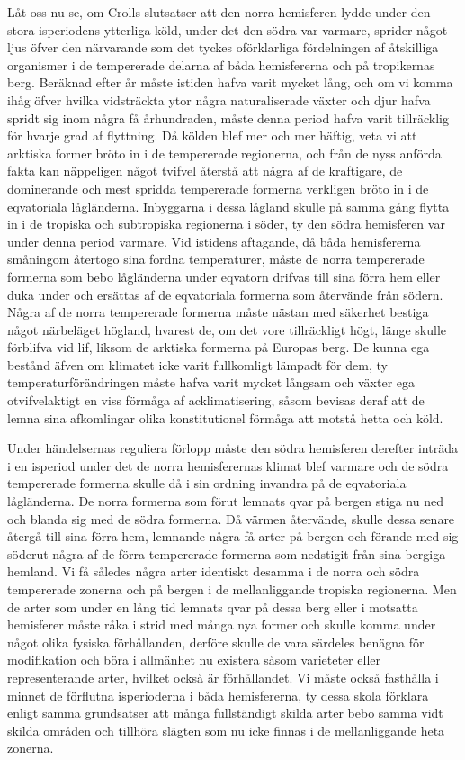 Låt oss nu se, om Crolls slutsatser att den norra hemisferen lydde under den stora isperiodens ytterliga köld, under det den södra var varmare, sprider något ljus öfver den närvarande som det tyckes oförklarliga fördelningen af åtskilliga organismer i de tempererade delarna af båda hemisfererna och på tropikernas berg. Beräknad efter år måste istiden hafva varit mycket lång, och om vi komma ihåg öfver hvilka vidsträckta ytor några naturaliserade växter och djur hafva spridt sig inom några få århundraden, måste denna period hafva varit tillräcklig för hvarje grad af flyttning. Då kölden blef mer och mer häftig, veta vi att arktiska former bröto in i de tempererade regionerna, och från de nyss anförda fakta kan näppeligen något tvifvel återstå att några af de kraftigare, de dominerande och mest spridda tempererade formerna verkligen bröto in i de eqvatoriala lågländerna. Inbyggarna i dessa lågland skulle på samma gång flytta in i de tropiska och subtropiska regionerna i söder, ty den södra hemisferen var under denna period varmare. Vid istidens aftagande, då båda hemisfererna småningom återtogo sina fordna temperaturer, måste de norra tempererade formerna som bebo lågländerna under eqvatorn drifvas till sina förra hem eller duka under och ersättas af de eqvatoriala formerna som återvände från södern. Några af de norra tempererade formerna måste nästan med säkerhet bestiga något närbeläget högland, hvarest de, om det vore tillräckligt högt, länge skulle förblifva vid lif, liksom de arktiska formerna på Europas berg. De kunna ega bestånd äfven om klimatet icke varit fullkomligt lämpadt för dem, ty temperaturförändringen måste hafva varit mycket långsam och växter ega otvifvelaktigt en viss förmåga af acklimatisering, såsom bevisas deraf att de lemna sina afkomlingar olika konstitutionel förmåga att motstå hetta och köld.

Under händelsernas reguliera förlopp måste den södra hemisferen derefter inträda i en isperiod under det de norra hemisferernas klimat blef varmare och de södra tempererade formerna skulle då i sin ordning invandra på de eqvatoriala lågländerna. De norra formerna som förut lemnats qvar på bergen stiga nu ned och blanda sig med de södra formerna. Då värmen återvände, skulle dessa senare återgå till sina förra hem, lemnande några få arter på bergen och förande med sig söderut några af de förra tempererade formerna som nedstigit från sina bergiga hemland. Vi få således några arter identiskt desamma i de norra och södra tempererade zonerna och på bergen i de mellanliggande tropiska regionerna. Men de arter som under en lång tid lemnats qvar på dessa berg eller i motsatta hemisferer måste råka i strid med många nya former och skulle komma under något olika fysiska förhållanden, derföre skulle de vara särdeles benägna för modifikation och böra i allmänhet nu existera såsom varieteter eller representerande arter, hvilket också är förhållandet. Vi måste också fasthålla i minnet de förflutna isperioderna i båda hemisfererna, ty dessa skola förklara enligt samma grundsatser att många fullständigt skilda arter bebo samma vidt skilda områden och tillhöra slägten som nu icke finnas i de mellanliggande heta zonerna.

